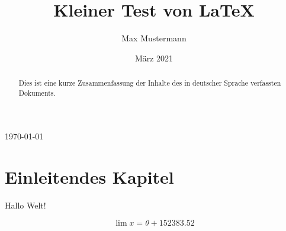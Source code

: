 \documentclass{article}
\title{Kleiner Test von LaTeX}
\author{Max Mustermann}
\date{März 2021}
\begin{document}
   \maketitle

   \today
\tableofcontents 

\vspace{2cm} %

\begin{abstract}
Dies ist eine kurze Zusammenfassung der Inhalte des in deutscher Sprache
verfassten Dokuments.
\end{abstract}

\section{Einleitendes Kapitel}

Hallo Welt!

\[ \lim x =  \theta + 152383.52 \]
\end{document}
